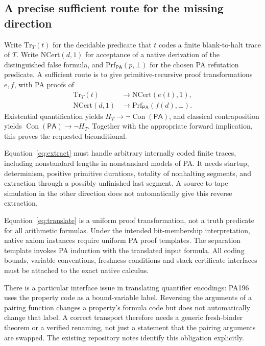 \documentclass[10pt,letterpaper]{article}
\newcommand{\PA}{\mathsf{PA}}
\newcommand{\Con}{\operatorname{Con}}
\begin{document}
\subsection{A precise sufficient route for the missing direction}

Write $\mathrm{Tr}_T(t)$ for the decidable predicate that $t$ codes a finite
blank-to-halt trace of $T$. Write $\mathrm{NCert}(d,1)$ for acceptance of a native
derivation of the distinguished false formula, and $\mathrm{Prf}_{\PA}(p,\bot)$
for the chosen PA refutation predicate. A sufficient route is to give
primitive-recursive proof transformations $e,f$, with PA proofs of
\begin{align}
 \mathrm{Tr}_T(t)&\longrightarrow\mathrm{NCert}(e(t),1),\label{eq:extract}\\
 \mathrm{NCert}(d,1)&\longrightarrow\mathrm{Prf}_{\PA}(f(d),\bot).\label{eq:translate}
\end{align}
Existential quantification yields $H_T\to\neg\Con(\PA)$, and classical
contraposition yields $\Con(\PA)\to\neg H_T$. Together with the appropriate
forward implication, this proves the requested biconditional.

Equation~\eqref{eq:extract} must handle arbitrary internally coded finite
traces, including nonstandard lengths in nonstandard models of PA. It needs
startup, determinism, positive primitive durations, totality of nonhalting
segments, and extraction through a possibly unfinished last segment. A
source-to-tape simulation in the other direction does not automatically give
this reverse extraction.

Equation~\eqref{eq:translate} is a uniform proof transformation, not a truth
predicate for all arithmetic formulas. Under the intended bit-membership
interpretation, native axiom instances require uniform PA proof templates.
The separation template invokes PA induction with the translated input formula.
All coding bounds, variable conventions, freshness conditions and stack
certificate interfaces must be attached to the exact native calculus.

There is a particular interface issue in translating quantifier encodings:
PA196 uses the property code as a bound-variable label. Reversing the arguments
of a pairing function changes a property's formula code but does not
automatically change that label. A correct transport therefore needs a generic
fresh-binder theorem or a verified renaming, not just a statement that the
pairing arguments are swapped. The existing repository notes identify this
obligation explicitly.
\end{document}
